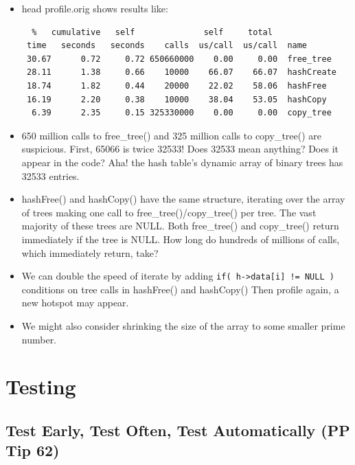 \documentclass[aspectratio=169]{beamer}
\newcommand{\pitem}{\pause \item}
\begin{document}
\begin{frame}[fragile]
    \begin{itemize}
    \item
      \alert{head profile.orig} shows results like:
\small
\begin{verbatim}
  %   cumulative   self              self     total           
 time   seconds   seconds    calls  us/call  us/call  name    
 30.67      0.72     0.72 650660000    0.00     0.00  free_tree
 28.11      1.38     0.66    10000    66.07    66.07  hashCreate
 18.74      1.82     0.44    20000    22.02    58.06  hashFree
 16.19      2.20     0.38    10000    38.04    53.05  hashCopy
  6.39      2.35     0.15 325330000    0.00     0.00  copy_tree
\end{verbatim}
    \pitem
    650 million calls to \alert{free\_tree()} and
    325 million calls to \alert{copy\_tree()} are suspicious.
    First, 65066 is twice 32533!
    Does 32533 mean anything?  Does it appear in the code?
    \pause
    Aha! the hash table's \alert{dynamic array of binary trees}
    has 32533 entries.
    \pitem
    \alert{hashFree()} and \alert{hashCopy()} have the same
    structure, iterating over the array of trees
    making one call to \alert{free\_tree()/copy\_tree()} per tree.
    The \alert{vast majority} of these trees are \alert{NULL}.
    Both \alert{free\_tree()} and \alert{copy\_tree()} return immediately
    if the tree is NULL.
    \pause
    How long do hundreds of millions of calls, which immediately return, take?

    \pitem
    We can \alert{double the speed} of \alert{iterate} by adding
    \verb+if( h->data[i] != NULL )+ conditions on tree calls
    in \alert{hashFree()} and \alert{hashCopy()}
    \pause
    Then profile again, a new hotspot may appear.
    \pitem
    We might also consider \alert{shrinking the size of the array}
    to some smaller prime number.
    \end{itemize}
\end{frame}

\section{Testing}
\subsection{Test Early, Test Often, Test Automatically (PP Tip 62)}
\end{document}
